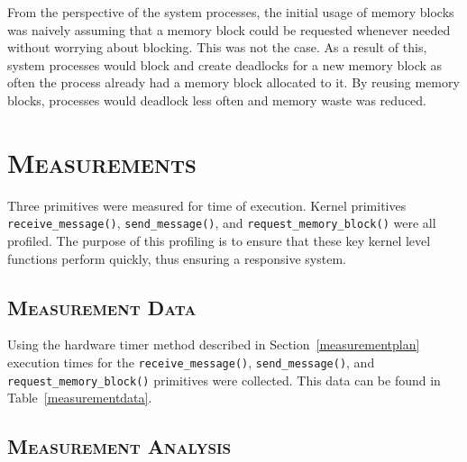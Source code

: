 \documentclass[oneside]{report}
\begin{document}
From the perspective of the system processes, the initial usage of memory blocks was
naively assuming that a memory block could be requested whenever needed without
worrying about blocking. This was not the case. As a result of this, system processes
would block and create deadlocks for a new memory block as often the process
already had a memory block allocated to it. By reusing memory blocks, processes
would deadlock less often and memory waste was reduced.

\chapter{\textsc{Measurements}}

Three primitives were measured for time of execution. Kernel primitives
\texttt{receive\_message()}, \texttt{send\_message()}, and
\texttt{request\_memory\_block()} were all profiled. The purpose of this
profiling is to ensure that these key kernel level functions perform quickly,
thus ensuring a responsive system.

\section{\textsc{Measurement Data}}

Using the hardware timer method described in
Section~\ref{measurementplan} execution times for the
\texttt{receive\_message()}, \texttt{send\_message()}, and
\texttt{request\_memory\_block()} primitives were collected. This data
can be found in Table~\ref{measurementdata}.

\begin{table}[H]
    \caption{Execution time of primitives}
    \label{measurementdata}
\end{table}

\section{\textsc{Measurement Analysis}}
\end{document}
